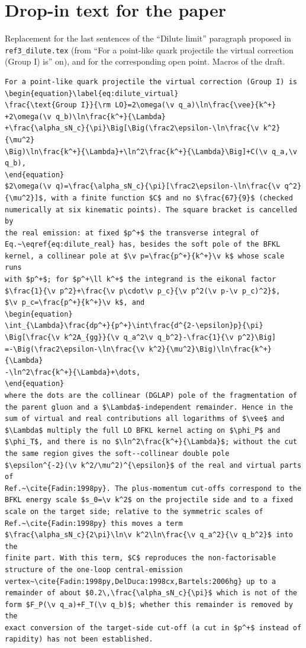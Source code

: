 \documentclass[11pt,a4paper]{article}
\renewcommand{\v}[1]{\bm{#1}}
\begin{document}
\section{Drop-in text for the paper}
Replacement for the last sentences of the ``Dilute limit'' paragraph proposed in \texttt{ref3\_dilute.tex} (from ``For a point-like quark projectile the virtual correction (Group I) is'' on), and for the corresponding open point. Macros of the draft.
\begin{verbatim}
For a point-like quark projectile the virtual correction (Group I) is
\begin{equation}\label{eq:dilute_virtual}
\frac{\text{Group I}}{\rm LO}=2\omega(\v q_a)\ln\frac{\vee}{k^+}
+2\omega(\v q_b)\ln\frac{k^+}{\Lambda}
+\frac{\alpha_sN_c}{\pi}\Big[\Big(\frac2\epsilon-\ln\frac{\v k^2}{\mu^2}
\Big)\ln\frac{k^+}{\Lambda}+\ln^2\frac{k^+}{\Lambda}\Big]+C(\v q_a,\v q_b),
\end{equation}
$2\omega(\v q)=\frac{\alpha_sN_c}{\pi}[\frac2\epsilon-\ln\frac{\v q^2}
{\mu^2}]$, with a finite function $C$ and no $\frac{67}{9}$ (checked
numerically at six kinematic points). The square bracket is cancelled by
the real emission: at fixed $p^+$ the transverse integral of
Eq.~\eqref{eq:dilute_real} has, besides the soft pole of the BFKL
kernel, a collinear pole at $\v p=\frac{p^+}{k^+}\v k$ whose scale runs
with $p^+$; for $p^+\ll k^+$ the integrand is the eikonal factor
$\frac{1}{\v p^2}+\frac{\v p\cdot\v p_c}{\v p^2(\v p-\v p_c)^2}$,
$\v p_c=\frac{p^+}{k^+}\v k$, and
\begin{equation}
\int_{\Lambda}\frac{dp^+}{p^+}\int\frac{d^{2-\epsilon}p}{\pi}
\Big[\frac{\v k^2A_{gg}}{\v q_a^2\v q_b^2}-\frac{1}{\v p^2}\Big]
=-\Big(\frac2\epsilon-\ln\frac{\v k^2}{\mu^2}\Big)\ln\frac{k^+}{\Lambda}
-\ln^2\frac{k^+}{\Lambda}+\dots,
\end{equation}
where the dots are the collinear (DGLAP) pole of the fragmentation of
the parent gluon and a $\Lambda$-independent remainder. Hence in the
sum of virtual and real contributions all logarithms of $\vee$ and
$\Lambda$ multiply the full LO BFKL kernel acting on $\phi_P$ and
$\phi_T$, and there is no $\ln^2\frac{k^+}{\Lambda}$; without the cut
the same region gives the soft--collinear double pole
$\epsilon^{-2}(\v k^2/\mu^2)^{\epsilon}$ of the real and virtual parts of
Ref.~\cite{Fadin:1998py}. The plus-momentum cut-offs correspond to the
BFKL energy scale $s_0=\v k^2$ on the projectile side and to a fixed
scale on the target side; relative to the symmetric scales of
Ref.~\cite{Fadin:1998py} this moves a term
$\frac{\alpha_sN_c}{2\pi}\ln\v k^2\ln\frac{\v q_a^2}{\v q_b^2}$ into the
finite part. With this term, $C$ reproduces the non-factorisable
structure of the one-loop central-emission
vertex~\cite{Fadin:1998py,DelDuca:1998cx,Bartels:2006hg} up to a
remainder of about $0.2\,\frac{\alpha_sN_c}{\pi}$ which is not of the
form $F_P(\v q_a)+F_T(\v q_b)$; whether this remainder is removed by the
exact conversion of the target-side cut-off (a cut in $p^+$ instead of
rapidity) has not been established.
\end{verbatim}
\end{document}
